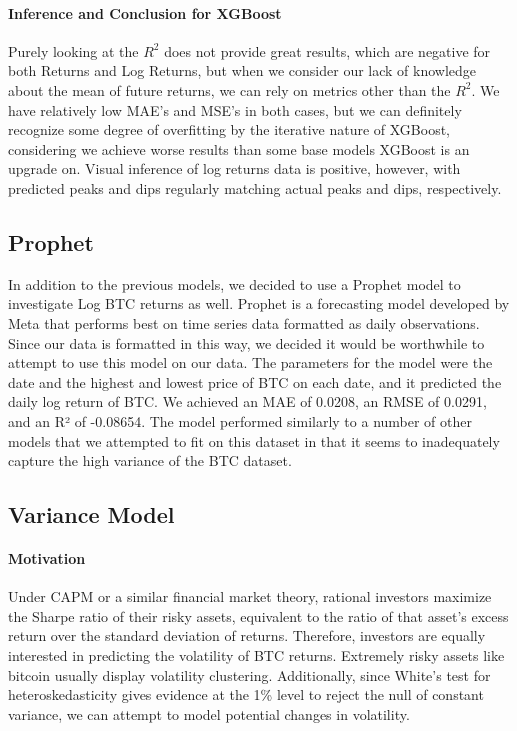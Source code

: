 \documentclass{article}
\begin{document}
\paragraph{Inference and Conclusion for XGBoost}
Purely looking at the $R^2$ does not provide great results, which are negative for both Returns and Log Returns, but when we consider our lack of knowledge about the mean of future returns, we can rely on metrics other than the $R^2$. We have relatively low MAE’s and MSE’s in both cases, but we can definitely recognize some degree of overfitting by the iterative nature of XGBoost, considering we achieve worse results than some base models XGBoost is an upgrade on. Visual inference of log returns data is positive, however, with predicted peaks and dips regularly matching actual peaks and dips, respectively.

\subsection{Prophet}
In addition to the previous models, we decided to use a Prophet model to investigate Log BTC returns as well. Prophet is a forecasting model developed by Meta that performs best on time series data formatted as daily observations. Since our data is formatted in this way, we decided it would be worthwhile to attempt to use this model on our data. The parameters for the model were the date and the highest and lowest price of BTC on each date, and it predicted the daily log return of BTC. We achieved an MAE of 0.0208, an RMSE  of 0.0291, and an R² of -0.08654. The model performed similarly to a number of other models that we attempted to fit on this dataset in that it seems to inadequately capture the high variance of the BTC dataset. 

\subsection{Variance Model}
\paragraph{Motivation}
Under CAPM or a similar financial market theory, rational investors maximize the Sharpe ratio of their risky assets, equivalent to the ratio of that asset’s excess return over the standard deviation of returns. Therefore, investors are equally interested in predicting the volatility of BTC returns. Extremely risky assets like bitcoin usually display volatility clustering. Additionally, since White’s test for heteroskedasticity gives evidence at the 1\% level to reject the null of constant variance, we can attempt to model potential changes in volatility.
\end{document}
